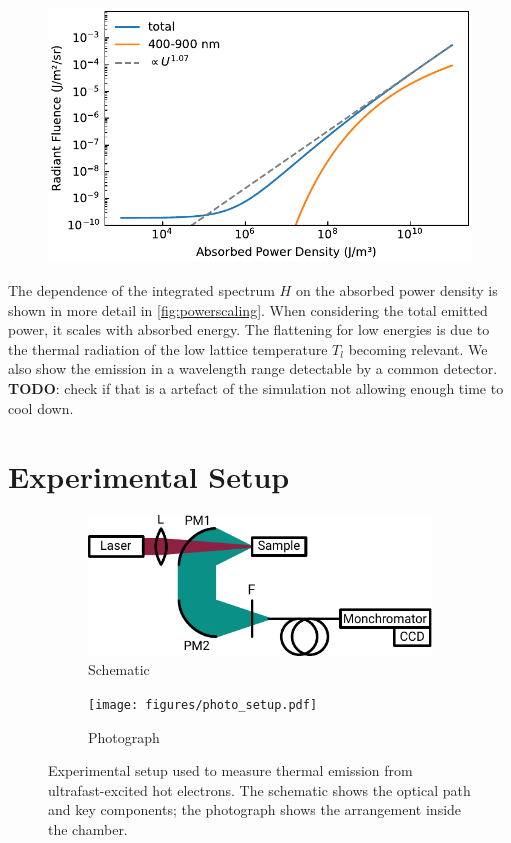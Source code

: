 \documentclass[
	a4paper,
]{scrarticle}
\begin{document}
\begin{figure}
    \centering
    \includegraphics{../analysis/figures/powerscaling.pdf}
    \caption{}
    \label{fig:powerscaling}
\end{figure}
The dependence of the integrated spectrum $H$ on the absorbed power density is shown in more detail in \autoref{fig:powerscaling}.
When considering the total emitted power, it scales with absorbed energy. The flattening for low energies is due to the thermal radiation of the low lattice temperature $T_l$ becoming relevant.
We also show the emission in a wavelength range detectable by a common detector.
\textbf{TODO}: check if that is a artefact of the simulation not allowing enough time to cool down.

\clearpage
\section{Experimental Setup}
\begin{figure}[h]
    \centering
    \begin{subfigure}{3.5in}
        \centering
        \includegraphics{figures/setup.pdf}
        \caption{Schematic}
    \end{subfigure}\hfill
    \begin{subfigure}{2in}
        \centering
        \texttt{[image: figures/photo\_setup.pdf]}
        \caption{Photograph}
    \end{subfigure}
    \caption{Experimental setup used to measure thermal emission from ultrafast-excited hot electrons. The schematic shows the optical path and key components; the photograph shows the arrangement inside the chamber.}
    \label{fig:setup}
\end{figure}
\end{document}
